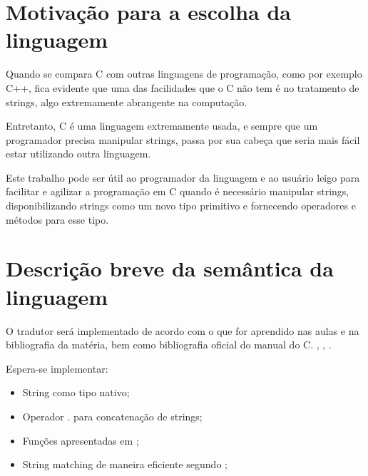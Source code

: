 \documentclass[12pt]{article}
\begin{document}
\section{Motivação para a escolha da linguagem}

\indent

Quando se compara C com outras linguagens de programação, como por exemplo C++, fica evidente que uma das facilidades que o C não tem é no tratamento de strings, algo extremamente abrangente na computação.

Entretanto, C é uma linguagem extremamente usada, e sempre que um programador precisa manipular strings, passa por sua cabeça que seria mais fácil estar utilizando outra linguagem.

Este trabalho pode ser útil ao programador da linguagem e ao usuário leigo para facilitar e agilizar a programação em C quando é necessário manipular strings, disponibilizando strings como um novo tipo primitivo e fornecendo operadores e métodos para esse tipo.

\section{Descrição breve da semântica da linguagem}

\indent

O tradutor será implementado de acordo com o que for aprendido nas aulas e na bibliografia da matéria, bem como bibliografia oficial do manual do C. \cite{compiladores2008}, \cite{gnuc}, \cite{yacc1995}.

Espera-se implementar:
\begin{itemize}
	\item String como tipo nativo;
	\item Operador . para concatenação de strings;
	\item Funções apresentadas em \cite{cplusplus};
	\item String matching de maneira eficiente segundo \cite{clrs09};
\end{itemize}

\end{document}
